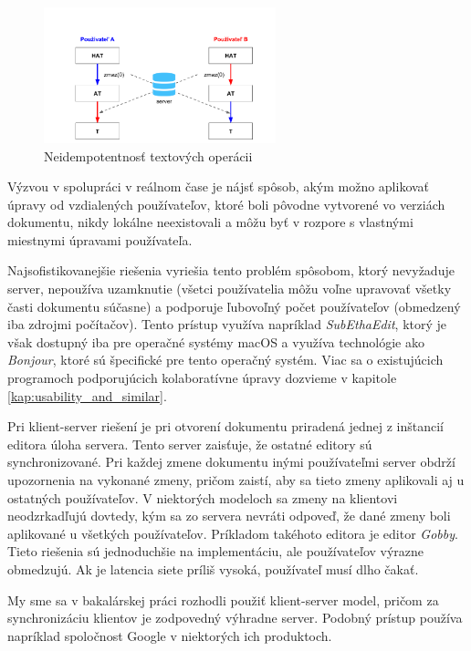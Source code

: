 \begin{figure}[H]
\centerline{\includegraphics[width=0.6\textwidth]{images/neidempotentne_operacie}}
\caption[Neidempotentnosť textových operácii]{Neidempotentnosť textových operácii}
\label{obr:neidempotentnost}
\end{figure}

Výzvou v spolupráci v reálnom čase je nájsť spôsob, akým možno aplikovať úpravy od vzdialených
používateľov, ktoré boli pôvodne vytvorené vo verziách dokumentu, nikdy lokálne neexistovali a môžu
byť v rozpore s vlastnými miestnymi úpravami používateľa. 

Najsofistikovanejšie riešenia vyriešia tento problém spôsobom, ktorý nevyžaduje server, nepoužíva
uzamknutie (všetci používatelia môžu voľne upravovať všetky časti dokumentu súčasne) a podporuje
ľubovoľný počet používateľov (obmedzený iba zdrojmi počítačov). Tento prístup využíva napríklad
\textit{SubEthaEdit}, ktorý je však dostupný iba pre operačné systémy macOS a využíva
technológie ako \textit{Bonjour}, ktoré sú špecifické pre tento operačný systém. Viac sa o
existujúcich programoch podporujúcich kolaboratívne úpravy dozvieme v kapitole
\ref{kap:usability_and_similar}.

Pri klient-server riešení je pri otvorení dokumentu priradená jednej z inštancií editora
úloha servera. Tento server zaisťuje, že ostatné editory sú synchronizované. Pri každej zmene
dokumentu inými používateľmi server obdrží upozornenia na vykonané zmeny, pričom zaistí, aby
sa tieto zmeny aplikovali aj u ostatných používateľov. 
V niektorých modeloch sa zmeny na klientovi neodzrkadľujú dovtedy,
kým sa zo servera nevráti odpoveď, že dané zmeny boli aplikované u všetkých používateľov.
Príkladom takéhoto editora je editor \textit{Gobby}. Tieto riešenia sú 
jednoduchšie na implementáciu, ale používateľov výrazne obmedzujú. Ak je latencia siete
príliš vysoká, používateľ musí dlho čakať.

My sme sa v bakalárskej práci rozhodli použiť klient-server model, pričom za synchronizáciu klientov
je zodpovedný výhradne server. Podobný prístup používa napríklad spoločnost Google v 
niektorých ich produktoch.

